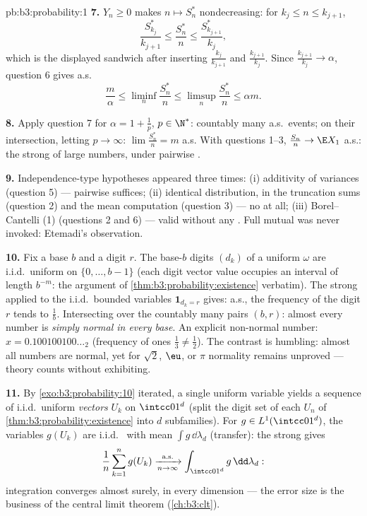 \begin{solution}{pb:b3:probability:1}
\textbf{7.} $Y_n \geq 0$ makes $n \mapsto S^*_n$
nondecreasing: for $k_j \leq n \leq k_{j+1}$,
\[
\frac{S^*_{k_j}}{k_{j+1}} \leq \frac{S^*_n}{n} \leq
\frac{S^*_{k_{j+1}}}{k_j},
\]
which is the displayed sandwich after inserting
$\frac{k_j}{k_{j+1}}$ and $\frac{k_{j+1}}{k_j}$. Since
$\frac{k_{j+1}}{k_j} \to \alpha$, question 6 gives a.s.
\[
\frac m\alpha \leq \liminf_n\frac{S^*_n}n \leq
\limsup_n\frac{S^*_n}n \leq \alpha m .
\]

\textbf{8.} Apply question 7 for $\alpha = 1 + \frac1p$, $p
\in \N^*$: countably many a.s.\ events; on their
intersection, letting $p \to \infty$: $\lim\frac{S^*_n}n =
m$ a.s. With questions 1--3, $\frac{S_n}n \to \E X_1$
a.s.: the strong  of large numbers, under pairwise
.

\textbf{9.} Independence-type hypotheses appeared three
times: (i) additivity of variances (question 5) ---
pairwise suffices; (ii) identical distribution, in the
truncation sums (question 2) and the mean computation
(question 3) --- no  at all; (iii)
Borel--Cantelli (1) (questions 2 and 6) --- valid without
any . Full mutual  was never
invoked: Etemadi's observation.

\textbf{10.} Fix a base $b$ and a digit $r$. The base-$b$
digits $(d_k)$ of a uniform $\omega$ are i.i.d.\ uniform on
$\{0, \dots, b-1\}$ (each digit vector value occupies an
interval of length $b^{-m}$: the argument of
\cref{thm:b3:probability:existence} verbatim). The strong
 applied to the i.i.d.\ bounded variables $\mathbf
1_{d_k = r}$ gives: a.s., the frequency of the digit $r$
tends to $\frac1b$. Intersecting over the countably many
pairs $(b, r)$: almost every number is
\emph{simply normal in every base}. An explicit non-normal
number: $x = 0.100100100\ldots_2$ (frequency of ones
$\frac13 \neq \frac12$). The contrast is humbling: almost
all numbers are normal, yet for $\sqrt2$, $\eu$, or $\pi$
normality remains unproved ---  theory counts
without exhibiting.

\textbf{11.} By \cref{exo:b3:probability:10} iterated, a
single uniform variable yields a sequence of i.i.d.\
uniform \emph{vectors} $U_k$ on $\intcc01^d$ (split the
digit set of each $U_n$ of
\cref{thm:b3:probability:existence} into $d$ subfamilies).
For $g \in L^1(\intcc01^d)$, the variables $g(U_k)$ are
i.i.d.\  with mean $\int g\,\dd\lambda_d$
(transfer): the strong \omterm{def:b3:probability:space}{law} gives
\[
\frac1n\sum_{k=1}^ng(U_k)
\xrightarrow[n\to\infty]{\text{a.s.}}
\int_{\intcc01^d}g\,\dd\lambda_d :
\]
 integration converges almost surely, in every
dimension --- the error size is the business of the central
limit theorem (\cref{ch:b3:clt}).


\end{solution}
